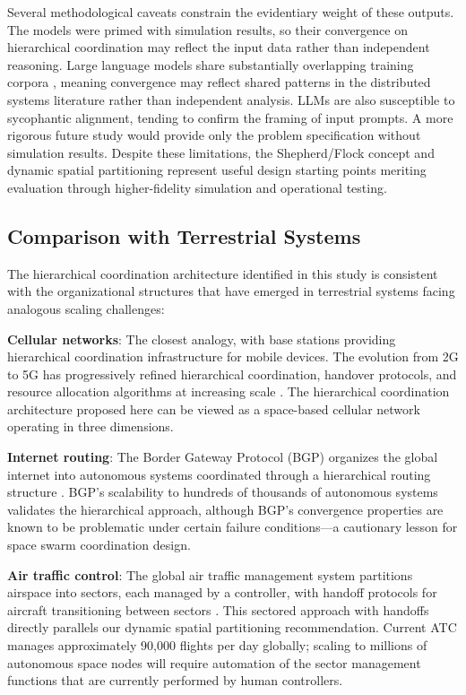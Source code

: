 \documentclass[journal]{IEEEtran}
\begin{document}
Several methodological caveats constrain the evidentiary weight of these outputs. The models were primed with simulation results, so their convergence on hierarchical coordination may reflect the input data rather than independent reasoning. Large language models share substantially overlapping training corpora \cite{brown_gpt3}, meaning convergence may reflect shared patterns in the distributed systems literature rather than independent analysis. LLMs are also susceptible to sycophantic alignment, tending to confirm the framing of input prompts. A more rigorous future study would provide only the problem specification without simulation results. Despite these limitations, the Shepherd/Flock concept and dynamic spatial partitioning represent useful design starting points meriting evaluation through higher-fidelity simulation and operational testing.

\subsection{Comparison with Terrestrial Systems}

The hierarchical coordination architecture identified in this study is consistent with the organizational structures that have emerged in terrestrial systems facing analogous scaling challenges:

\textbf{Cellular networks}: The closest analogy, with base stations providing hierarchical coordination infrastructure for mobile devices. The evolution from 2G to 5G has progressively refined hierarchical coordination, handover protocols, and resource allocation algorithms at increasing scale \cite{rappaport_wireless}. The hierarchical coordination architecture proposed here can be viewed as a space-based cellular network operating in three dimensions.

\textbf{Internet routing}: The Border Gateway Protocol (BGP) organizes the global internet into autonomous systems coordinated through a hierarchical routing structure \cite{rekhter_bgp}. BGP's scalability to hundreds of thousands of autonomous systems validates the hierarchical approach, although BGP's convergence properties are known to be problematic under certain failure conditions---a cautionary lesson for space swarm coordination design.

\textbf{Air traffic control}: The global air traffic management system partitions airspace into sectors, each managed by a controller, with handoff protocols for aircraft transitioning between sectors \cite{icao_atm}. This sectored approach with handoffs directly parallels our dynamic spatial partitioning recommendation. Current ATC manages approximately 90{,}000 flights per day globally; scaling to millions of autonomous space nodes will require automation of the sector management functions that are currently performed by human controllers.
\end{document}
